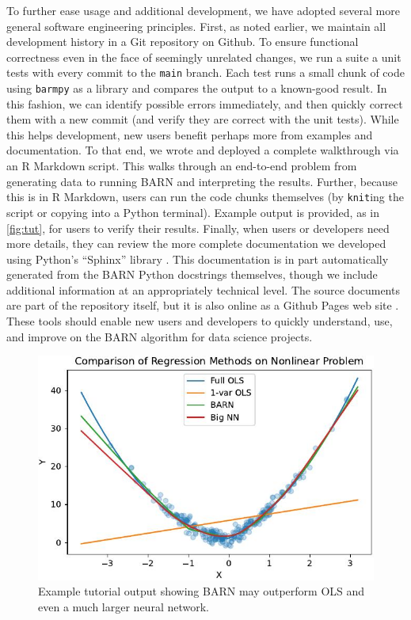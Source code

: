 \documentclass[12pt]{article}
\begin{document}
To further ease usage and additional development, we have adopted several more general software engineering principles.  First, as noted earlier, we maintain all development history in a Git repository on Github.  To ensure functional correctness even in the face of seemingly unrelated changes, we run a suite a unit tests with every commit to the \texttt{main} branch.  Each test runs a small chunk of code using \texttt{barmpy} as a library and compares the output to a known-good result.  In this fashion, we can identify possible errors immediately, and then quickly correct them with a new commit (and verify they are correct with the unit tests).  While this helps development, new users benefit perhaps more from examples and documentation.  To that end, we wrote and deployed a complete walkthrough via an R Markdown \cite{baumer2015r} script.  This walks through an end-to-end problem from generating data to running BARN and interpreting the results.  Further, because this is in R Markdown, users can run the code chunks themselves (by \texttt{knit}ing the script or copying into a Python terminal).  Example output is provided, as in \autoref{fig:tut}, for users to verify their results.  Finally, when users or developers need more details, they can review the more complete documentation we developed using Python's ``Sphinx'' library \cite{brandl2021sphinx}.  This documentation is in part automatically generated from the BARN Python docstrings themselves, though we include additional information at an appropriately technical level.  The source documents are part of the repository itself, but it is also online as a Github Pages web site \cite{vanboxel2023barmdoc}.   These tools should enable new users and developers to quickly understand, use, and improve on the BARN algorithm for data science projects.

\begin{figure}[htb]
\centering
    \includegraphics[scale=1]{figs/tut.jpg}
    \caption{Example tutorial output showing BARN may outperform OLS and even a much larger neural network.}
    \label{fig:tut}
\end{figure}
\end{document}
